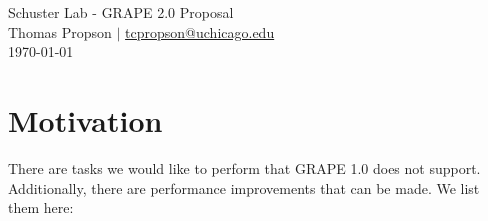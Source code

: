 \documentclass[letterpaper, 12pt]{article}
\begin{document}
\begin{center}
  {\huge Schuster Lab - GRAPE 2.0 Proposal} \\[0.5em]
  {\large Thomas Propson $\vert$ \href{mailto:tcpropson@uchicago.edu}
    {tcpropson@uchicago.edu} \\[0.5em] \today}
\end{center}

\section{Motivation}

There are tasks we would like to perform that GRAPE 1.0 \cite{leung2017speedup} does not support. Additionally, there are performance improvements that can be made. We list them here:
\end{document}
